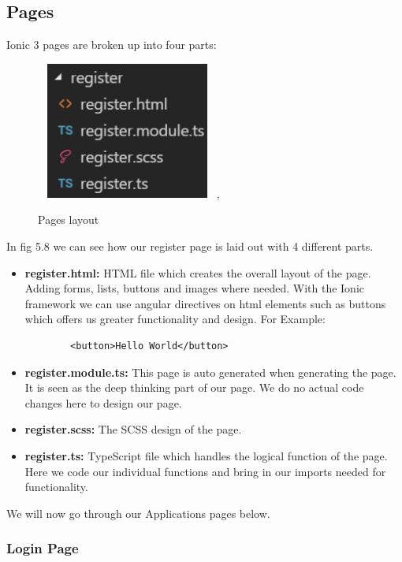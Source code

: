 \documentclass[12pt,a4paper,oneside,openany]{book}
\begin{document}
\subsection{Pages}
Ionic 3 pages are broken up into four parts:

\begin{figure}[ht]
\renewcommand\thefigure{5.8}
\centering
\includegraphics[width=6cm,height=4.5cm]{Images/pages.png},
\caption{Pages layout}
\label{pages}
\end{figure}

In fig 5.8 we can see how our register page is laid out with 4 different parts.

\begin{itemize}
    \item \textbf{register.html:} HTML file which creates the overall layout of the page. Adding forms, lists, buttons and images where needed. With the Ionic framework we can use angular directives on html elements such as buttons which oﬀers us greater functionality and design. For Example:
    \begin{verbatim}
        <button>Hello World</button>
    \end{verbatim}
    \item \textbf{register.module.ts:} This page is auto generated when generating the page. It is seen as the deep thinking part of our page. We do no actual code changes here to design our page.
    \item \textbf{register.scss:} The SCSS design of the page.
    \item \textbf{register.ts:} TypeScript ﬁle which handles the logical function of the page. Here we code our individual functions and bring in our imports needed for functionality.
\end{itemize}

We will now go through our Applications pages below.

\subsubsection{Login Page}
\end{document}
